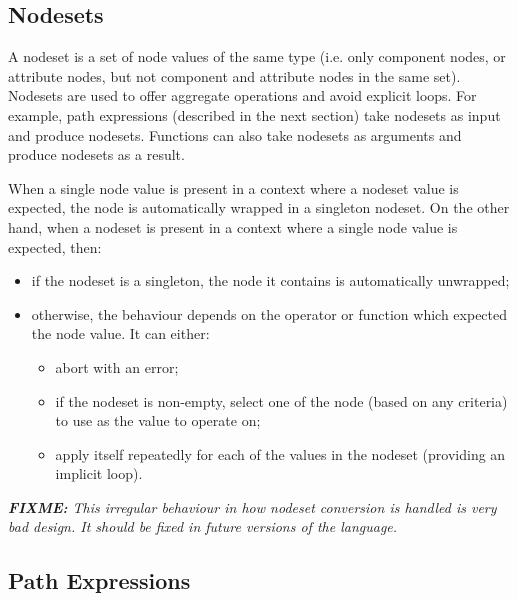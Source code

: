 \documentclass[a4paper,12pt]{report}
\newcommand{\fixme}[1]{\textit{\textbf{FIXME:} #1}}
\begin{document}
\subsection{Nodesets}
\label{sec:nodesets}

A nodeset is a set of node values of the same type (i.e. only component nodes, or
attribute nodes, but not component and attribute nodes in the same set). Nodesets are used
to offer aggregate operations and avoid explicit loops. For example, path expressions
(described in the next section) take nodesets as input and produce nodesets. Functions
can also take nodesets as arguments and produce nodesets as a result.

When a single node value is present in a context where a nodeset value is expected, the
node is automatically wrapped in a singleton nodeset. On the other hand, when a nodeset is
present in a context where a single node value is expected, then:
\begin{itemize}
\item if the nodeset is a singleton, the node it contains is automatically unwrapped;
\item otherwise, the behaviour depends on the operator or function which expected the node
  value. It can either:
  \begin{itemize}
  \item abort with an error;
  \item if the nodeset is non-empty, select one of the node (based on any criteria) to use
    as the value to operate on;
  \item apply itself repeatedly for each of the values in the nodeset (providing an
    implicit loop).
  \end{itemize}
\end{itemize}

\fixme{This irregular behaviour in how nodeset conversion is handled is very bad design.
  It should be fixed in future versions of the language.}

\subsection{Path Expressions}
\label{sec:path-expressions}
\end{document}
